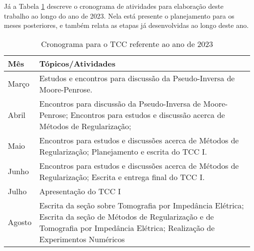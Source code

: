 Já a Tabela \ref{tab:cronograma} descreve o cronograma de atividades para elaboração deste trabalho ao longo do ano de 2023. Nela está presente o planejamento para os meses posteriores, e também relata as etapas já desenvolvidas ao longo deste ano.

\begin{table}[htb]
\caption{Cronograma para o TCC referente ao ano de 2023}
\label{tab:cronograma} 
\begin{center} 
\def\arraystretch{3}%
\begin{tabular}{ | m{} | m{} | } 

\hline

Mês & Tópicos/Atividades \\

\hline 
 
 \hline
 Março & 
    Estudos e encontros para discussão da Pseudo-Inversa de Moore-Penrose.\\ 

 \hline
 Abril &
    Encontros para discussão da Pseudo-Inversa de Moore-Penrose; 
    Encontros para estudos e discussão acerca de Métodos de Regularização;\\ 

 \hline
 Maio & 
    Encontros para estudos e discussões acerca de Métodos de Regularização; Planejamento e escrita do TCC I. \\

 \hline
 Junho & 
    Encontros para estudos e discussões acerca de Métodos de Regularização; Escrita e entrega final do TCC I.\\
    
 \hline
 Julho & 
    Apresentação do TCC I \\

\hline
 Agosto & 
    Escrita da seção sobre Tomografia por Impedância Elétrica; Escrita da seção de Métodos de Regularização e de Tomografia por Impedância Elétrica; Realização de Experimentos Numéricos \\


\end{tabular}
\end{center}
\end{table}
